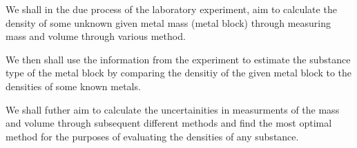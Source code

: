 {We shall in the due process of the laboratory experiment, aim to calculate the density of some unknown given metal mass (metal block) through measuring mass and volume through various method.}

{We then shall use the information from the experiment to estimate the substance type of the metal block by comparing the densitiy of the given metal block to the densities of some known metals.}

{We shall futher aim to calculate the uncertainities in measurments of the mass and volume through subsequent different methods and find the most optimal method for the purposes of evaluating the densities of any substance.}


